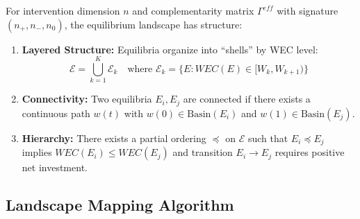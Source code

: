 \begin{theorem}
\label{thm:meq-landscape}

For intervention dimension $n$ and complementarity matrix $\Gamma^{eff}$ with
signature $(n_+, n_-, n_0)$, the equilibrium landscape has structure:

\begin{enumerate}
    \item \textbf{Layered Structure:} Equilibria organize into ``shells'' by WEC level:
    \begin{equation}
    \mathcal{E} = \bigcup_{k=1}^{K} \mathcal{E}_k \quad \text{where } \mathcal{E}_k = \{E : WEC(E) \in [W_k, W_{k+1})\}
    \end{equation}

    \item \textbf{Connectivity:} Two equilibria $E_i, E_j$ are connected if there
    exists a continuous path $w(t)$ with $w(0) \in \text{Basin}(E_i)$ and
    $w(1) \in \text{Basin}(E_j)$.

    \item \textbf{Hierarchy:} There exists a partial ordering $\preceq$ on $\mathcal{E}$
    such that $E_i \preceq E_j$ implies $WEC(E_i) \leq WEC(E_j)$ and transition
    $E_i \to E_j$ requires positive net investment.
\end{enumerate}
\end{theorem}

\subsection{Landscape Mapping Algorithm}

